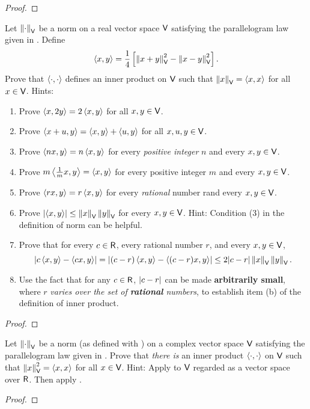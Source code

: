 \begin{proof}
\end{proof}

\begin{exercise} \label{exercise 6.1.29}
Let \(\left\lVert \cdot \right\rVert_{\textsf{V}}\) be a norm on a real vector space \(\textsf{V}\) satisfying the parallelogram law given in .
Define
\[
    \left< x, y \right> = \frac{1}{4} \left[ \left\lVert x + y\right\rVert_{\textsf{V}}^2 - \left\lVert x - y\right\rVert_{\textsf{V}}^2 \right].
\]
Prove that \(\left< \cdot, \cdot \right>\) defines an inner product on \(\textsf{V}\) such that \(\left\lVert x\right\rVert_{\textsf{V}} = \left< x, x \right>\) for all \(x \in \textsf{V}\).
Hints:
\begin{enumerate}
\item Prove \(\left< x, 2y \right> = 2 \left< x, y \right>\) for all \(x, y \in \textsf{V}\).
\item Prove \(\left< x + u, y \right> = \left< x, y \right> + \left< u, y \right>\) for all \(x, u, y \in \textsf{V}\).
\item Prove \(\left< nx, y \right> = n \left< x, y \right>\) for every \emph{positive integer} \(n\) and every \(x, y \in \textsf{V}\).
\item Prove \(m \left< \frac{1}{m} x, y \right> = \left< x, y \right>\) for every positive integer \(m\) and every \(x, y \in \textsf{V}\).
\item Prove \(\left< rx, y \right> = r \left< x, y \right>\) for every \emph{rational} number rand every \(x, y \in \textsf{V}\).
\item Prove \(\lvert \left< x, y \right> \rvert \le \left\lVert x\right\rVert_{\textsf{V}} \left\lVert y\right\rVert_{\textsf{V}}\) for every \(x, y \in \textsf{V}\).
Hint: Condition (3) in the definition of norm can be helpful.
\item Prove that for every \(c \in \textsf{R}\), every rational number \(r\), and every \(x, y \in \textsf{\textsf{V}}\),
\[
    \lvert c \left< x, y \right> - \left< cx, y \right> \rvert = \lvert (c - r) \left< x, y \right> - \left<(c - r)x, y \right>\rvert \le 2\lvert c - r\rvert \left\lVert x\right\rVert_{\textsf{V}} \left\lVert y\right\rVert_{\textsf{V}}.
\]
\item Use the fact that for any \(c \in \textsf{R}\), \(\lvert c - r\rvert\) can be made \textbf{arbitrarily small}, where \(r\) \emph{varies over the set of \textbf{rational} numbers}, to establish item (b) of the definition of inner product.
\end{enumerate}
\end{exercise}

\begin{proof}
\end{proof}

\begin{exercise} \label{exercise 6.1.30}
Let \(\left\lVert\cdot\right\rVert_{\textsf{V}}\) be a norm (as defined with ) on a complex vector space \(\textsf{V}\) satisfying the parallelogram law given in .
Prove that \emph{there is} an inner product \(\left< \cdot, \cdot \right>\) on \(\textsf{V}\) such that \(\left\lVert x\right\rVert_{\textsf{V}}^2 = \left< x, x \right>\) for all \(x \in \textsf{V}\).
Hint: Apply  to \(\textsf{V}\) regarded as a vector space over \(\textsf{R}\).
Then apply .
\end{exercise}
\begin{proof}
\end{proof}
